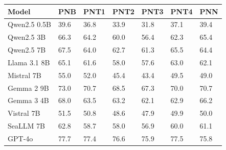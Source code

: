 \begin{tabular}{lllllll}
\toprule
       Model &  PNB & PNT1 & PNT2 & PNT3 & PNT4 &  PNN \\
\midrule
Qwen2.5 0.5B & 39.6 & 36.8 & 33.9 & 31.8 & 37.1 & 39.4 \\
  Qwen2.5 3B & 66.3 & 64.2 & 60.0 & 56.4 & 62.3 & 65.4 \\
  Qwen2.5 7B & 67.5 & 64.0 & 62.7 & 61.3 & 65.5 & 64.4 \\
Llama 3.1 8B & 65.1 & 61.6 & 58.0 & 57.6 & 63.0 & 62.1 \\
  Mistral 7B & 55.0 & 52.0 & 45.4 & 43.4 & 49.5 & 49.0 \\
  Gemma 2 9B & 73.0 & 70.7 & 68.5 & 67.3 & 70.0 & 70.7 \\
  Gemma 3 4B & 68.0 & 63.5 & 63.2 & 62.1 & 62.9 & 66.2 \\
  Vistral 7B & 51.5 & 50.8 & 48.6 & 47.9 & 49.9 & 50.0 \\
   SeaLLM 7B & 62.8 & 58.7 & 58.0 & 56.9 & 60.0 & 61.1 \\
      GPT-4o & 77.7 & 77.4 & 76.6 & 75.9 & 77.5 & 75.8 \\
\bottomrule
\end{tabular}
